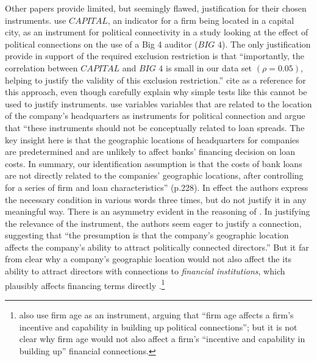 Other papers provide limited, but seemingly flawed, justification for their chosen instruments. 
 \citet{Guedhami:2013cj} use $\textit{CAPITAL}$, an indicator for a firm being located in a capital city, as an instrument for political connectivity in a study looking at the effect of political connections on the use of a Big 4 auditor ($\textit{BIG 4}$).
 The only justification \citet{Guedhami:2013cj} provide in support of the required exclusion restriction  is that ``importantly, the correlation between $\textit{CAPITAL}$ and $\textit{BIG 4}$ is small in our data set $(\rho = 0.05)$, helping to justify the validity of this exclusion restriction.''
 \citet{Guedhami:2013cj} cite \citet{Larcker:2010fq} as a reference for this approach, even though \citet{Larcker:2010fq} carefully explain why simple tests like this cannot be used to justify instruments.
 \citet{Houston:2014hv} use variables variables that are related to the location of the company's headquarters as instruments for political connection and argue that ``these instruments should not be conceptually related to loan spreads. The key insight here is that the geographic locations of headquarters for companies are predetermined and are unlikely to affect banks' financing decision on loan costs. In summary, our identification assumption is that the costs of bank loans are not directly related to the companies' geographic locations, after controlling for a series of firm and loan characteristics'' (p.228). In effect the authors express the necessary condition in various words three times, but do not justify it in any meaningful way.
 There is an asymmetry evident in the reasoning of \citet{Houston:2014hv}. In justifying the relevance of the instrument, the authors seem eager to justify a connection, suggesting that ``the presumption is that the company's geographic location affects the company's ability to attract politically connected directors.'' But it far from clear why a company's geographic location would not also affect the its ability to attract directors with connections to \emph{financial institutions}, which plausibly affects financing terms directly \citep{Guner:2008tp}.\footnote{\citet{Houston:2014hv} also use firm age as an instrument, arguing that ``firm age affects a firm's incentive and capability in building up political connections''; but it is not clear why firm age would not also affect a firm's ``incentive and capability in building up'' financial connections.} 
 
